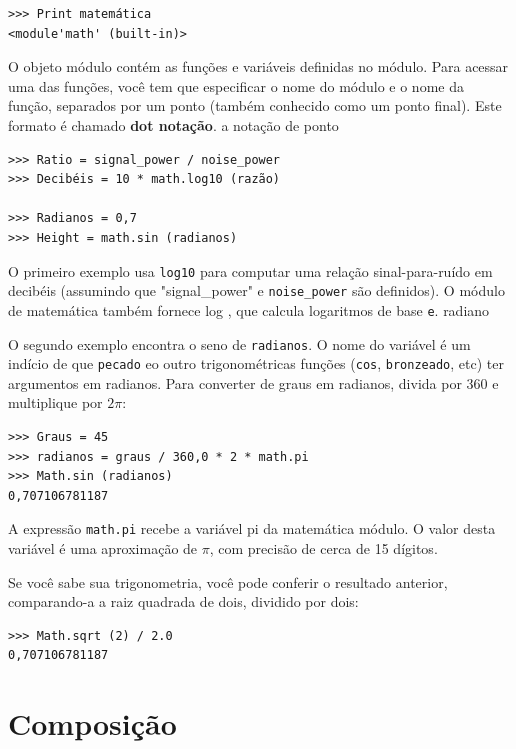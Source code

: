 \documentclass[10pt]{book}
\begin{document}
\begin{verbatim}
>>> Print matemática
<module'math' (built-in)>
\end{verbatim}
%
O objeto módulo contém as funções e variáveis ​​definidas no
módulo. Para acessar uma das funções, você tem que especificar o nome
do módulo e o nome da função, separados por um ponto (também
conhecido como um ponto final). Este formato é chamado {\bf dot notação}.
\index{} a notação de ponto

\begin{verbatim}
>>> Ratio = signal_power / noise_power
>>> Decibéis = 10 * math.log10 (razão)

>>> Radianos = 0,7
>>> Height = math.sin (radianos)
\end{verbatim}
%
O primeiro exemplo usa \verb "log10" para computar 
uma relação sinal-para-ruído em decibéis (assumindo que \verbo "signal_power" e
\Verb "noise_power" são definidos). O módulo de matemática também fornece {log \tt},
que calcula logaritmos de base {\tt e}.
\index{} radiano

O segundo exemplo encontra o seno de {\tt radianos}. O nome do
variável é um indício de que {\tt pecado} eo outro trigonométricas
funções ({\tt cos}, {\tt bronzeado}, etc) ter argumentos em radianos. Para
converter de graus em radianos, divida por 360 e multiplique por
$ 2 \pi $:

\begin{verbatim}
>>> Graus = 45
>>> radianos = graus / 360,0 * 2 * math.pi
>>> Math.sin (radianos)
0,707106781187
\end{verbatim}
%
A expressão {\tt math.pi} recebe a variável {pi \tt} da matemática
módulo. O valor desta variável é uma aproximação
de $ \pi $, com precisão de cerca de 15 dígitos.

Se você sabe
sua trigonometria, você pode conferir o resultado anterior, comparando-a
a raiz quadrada de dois, dividido por dois:

\begin{verbatim}
>>> Math.sqrt (2) / 2.0
0,707106781187
\end{verbatim}
%

\section{Composição}
\end{document}
